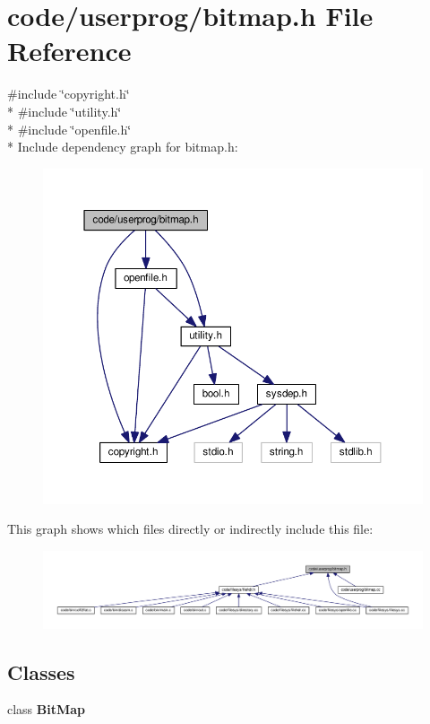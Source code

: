 \section{code/userprog/bitmap.h File Reference}
\label{bitmap_8h}
{\ttfamily \#include \char`\"{}copyright.\+h\char`\"{}}\\*
{\ttfamily \#include \char`\"{}utility.\+h\char`\"{}}\\*
{\ttfamily \#include \char`\"{}openfile.\+h\char`\"{}}\\*
Include dependency graph for bitmap.\+h\+:
\nopagebreak
\begin{figure}[H]
\begin{center}
\leavevmode
\includegraphics[width=350pt]{bitmap_8h__incl}
\end{center}
\end{figure}
This graph shows which files directly or indirectly include this file\+:
\nopagebreak
\begin{figure}[H]
\begin{center}
\leavevmode
\includegraphics[width=350pt]{bitmap_8h__dep__incl}
\end{center}
\end{figure}
\subsection*{Classes}
\begin{DoxyCompactItemize}
\item 
class {\bf Bit\+Map}
\end{DoxyCompactItemize}
